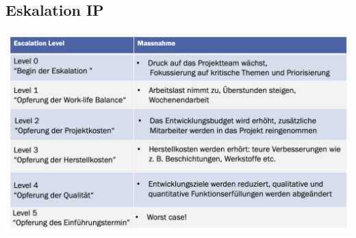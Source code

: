 \subsection{Eskalation \hfill IP}
    \begin{footnotesize}
        \includegraphics[width = 0.75\linewidth]{MAEIP_Eskalation}
    \end{footnotesize}